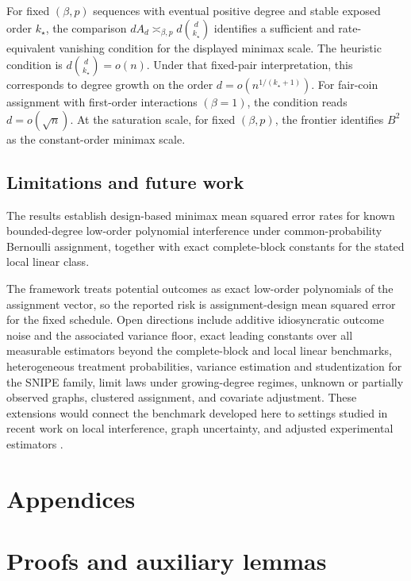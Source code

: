 \documentclass[11pt]{article}
\begin{document}
For fixed \((\beta,p)\) sequences with eventual positive degree and stable exposed order \(k_\star\), the comparison \(dA_d\asymp_{\beta,p} d\binom d{k_\star}\) identifies a sufficient and rate-equivalent vanishing condition for the displayed minimax scale. The heuristic condition is \(d\binom d{k_\star}=o(n)\). Under that fixed-pair interpretation, this corresponds to degree growth on the order \(d=o(n^{1/(k_\star+1)})\). For fair-coin assignment with first-order interactions \((\beta=1)\), the condition reads \(d=o(\sqrt n)\). At the saturation scale, for fixed \((\beta,p)\), the frontier identifies \(B^2\) as the constant-order minimax scale.

\subsection{Limitations and future work}

The results establish design-based minimax mean squared error rates for known bounded-degree low-order polynomial interference under common-probability Bernoulli assignment, together with exact complete-block constants for the stated local linear class.

The framework treats potential outcomes as exact low-order polynomials of the assignment vector, so the reported risk is assignment-design mean squared error for the fixed schedule. Open directions include additive idiosyncratic outcome noise and the associated variance floor, exact leading constants over all measurable estimators beyond the complete-block and local linear benchmarks, heterogeneous treatment probabilities, variance estimation and studentization for the SNIPE family, limit laws under growing-degree regimes, unknown or partially observed graphs, clustered assignment, and covariate adjustment. These extensions would connect the benchmark developed here to settings studied in recent work on local interference, graph uncertainty, and adjusted experimental estimators \citep{Savje2021,Leung2022,Hu2022,Gao2025,EichhornKhanUganderYu2026,WangLi2026}.


\appendix

\section*{Appendices}

\section{Proofs and auxiliary lemmas}
\end{document}
